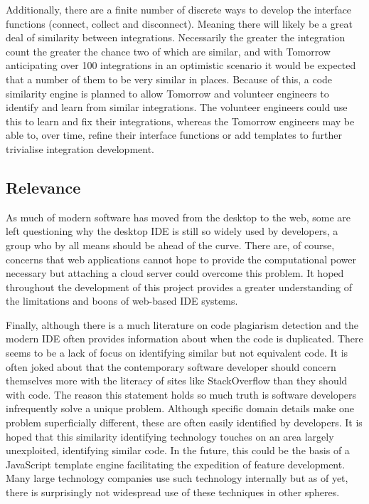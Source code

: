 \documentclass[jou,apacite]{apa6}
\begin{document}
Additionally, there are a finite number of discrete ways to develop the interface functions (connect, collect and disconnect). Meaning there will likely be a great deal of similarity between integrations. Necessarily the greater the integration count the greater the chance two of which are similar, and with Tomorrow anticipating over 100 integrations in an optimistic scenario it would be expected that a number of them to be very similar in places. Because of this, a code similarity engine is planned to allow Tomorrow and volunteer engineers to identify and learn from similar integrations. The volunteer engineers could use this to learn and fix their integrations, whereas the Tomorrow engineers may be able to, over time, refine their interface functions or add templates to further trivialise integration development.

\subsection{Relevance}
As much of modern software has moved from the desktop to the web, some are left questioning why the desktop IDE is still so widely used by developers, a group who by all means should be ahead of the curve. There are, of course, concerns that web applications cannot hope to provide the computational power necessary but attaching a cloud server could overcome this problem. It hoped throughout the development of this project provides a greater understanding of the limitations and boons of web-based IDE systems. 

Finally, although there is a much literature on code plagiarism detection and the modern IDE often provides information about when the code is duplicated. There seems to be a lack of focus on identifying similar but not equivalent code. It is often joked about that the contemporary software developer should concern themselves more with the literacy of sites like StackOverflow than they should with code. The reason this statement holds so much truth is software developers infrequently solve a unique problem. Although specific domain details make one problem superficially different, these are often easily identified by developers. It is hoped that this similarity identifying technology touches on an area largely unexploited, identifying similar code. In the future, this could be the basis of a JavaScript template engine facilitating the expedition of feature development. Many large technology companies use such technology internally but as of yet, there is surprisingly not widespread use of these techniques in other spheres.
\end{document}
